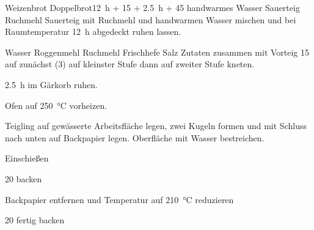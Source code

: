 \begin{MyRecipe}{Weizenbrot}{ Doppelbrot}{\SI{12}{\hour} + \SI{15}{\minuteprime} + \SI{2,5}{\hour} + \SI{45}{\minuteprime}}
	\ingredient[\Calc{50}{\x}]{\si{\gram}} {handwarmes Wasser}
	\ingredient[\Calc{5}{\x}]{\si{\gram}} {Sauerteig}
	\ingredient[\Calc{50}{\x}]{\si{\gram}} {Ruchmehl}
	Sauerteig mit Ruchmehl und handwarmen Wasser mischen und bei Raumtemperatur \SI{12}{\hour} abgedeckt ruhen lassen.\par\bigskip

	\ingredient[\Calc{0.4}{\x}]{\si{\liter}} {Wasser}
	\ingredient[\Calc{125}{\x}]{\si{\gram}} {Roggenmehl}
	\ingredient[\Calc{325}{\x}]{\si{\gram}} {Ruchmehl}
	\ingredient[\Calc{5}{\x}]{\si{\gram}} {Frischhefe}
	\ingredient[\Calc{10}{\x}]{\si{\gram}} {Salz}
	Zutaten zusammen mit Vorteig \SI{15}{\minuteprime} auf zunächst (\SI{3}{\minuteprime}) auf kleinster Stufe dann auf zweiter Stufe kneten.
	
	\SI{2,5}{\hour} im Gärkorb ruhen.\par\bigskip

	Ofen auf \SI{250}{\degreeCelsius} vorheizen.
	
	Teigling auf gewässerte Arbeitsfläche legen, zwei Kugeln formen und mit Schluss nach unten auf Backpapier legen. Oberfläche mit Wasser bestreichen.\par\bigskip
	
	Einschießen
	
	\SI{20}{\minuteprime} backen
	
	Backpapier entfernen und Temperatur auf \SI{210}{\degreeCelsius} reduzieren
	
	\SI{20}{\minuteprime} fertig backen
	
	
	
	
	
	
\end{MyRecipe}